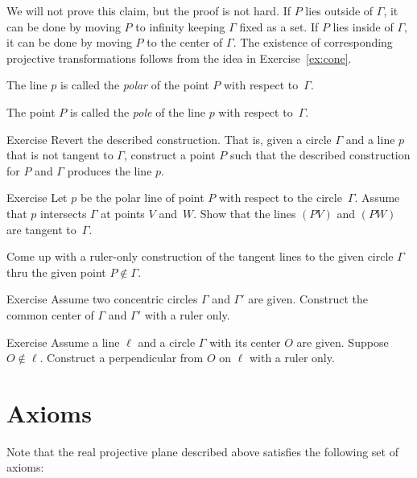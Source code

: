 We will not prove this claim, but the proof is not hard.
If $P$ lies outside of $\Gamma$, it can be done by moving $P$ to infinity keeping $\Gamma$ fixed as a set.
If $P$ lies inside of $\Gamma$, it can be done by moving $P$ to the center of $\Gamma$.
The existence of corresponding projective transformations follows from the idea in Exercise~\ref{ex:cone}.

The line $p$ is called the \emph{polar} of the point $P$ with respect to~$\Gamma$.

The point $P$ is called the \emph{pole} of the line $p$ with respect to~$\Gamma$.

\begin{thm}{Exercise}\label{ex:revert}
Revert the described construction.
That is, given a circle $\Gamma$ and a line $p$ that is not tangent to $\Gamma$, construct a point $P$ such that the described construction for $P$ and $\Gamma$ produces the line $p$.
\end{thm}

\begin{thm}{Exercise}\label{ex:tangent ruler}
Let $p$ be the polar line of point $P$ with respect to the circle~$\Gamma$.
Assume that $p$ intersects $\Gamma$ at points $V$ and~$W$.
Show that the lines $(PV)$ and $(PW)$ are tangent to~$\Gamma$.

Come up with a ruler-only construction of the tangent lines to the given circle $\Gamma$ thru the given point $P\notin\Gamma$.
\end{thm}

\begin{thm}{Exercise}\label{ex:concentric-circ}
Assume two concentric circles $\Gamma$ and $\Gamma'$ are given.
Construct the common center of $\Gamma$ and $\Gamma'$ with a ruler only.
\end{thm}

\begin{thm}{Exercise}\label{ex:proj-perp}
Assume a line $\ell$ and a circle $\Gamma$ with its center $O$ are given.
Suppose $O\notin \ell$.
Construct a perpendicular from $O$ on $\ell$ with a ruler only.
\end{thm}

\section{Axioms}

Note that the real projective plane described above satisfies the following set of axioms:

